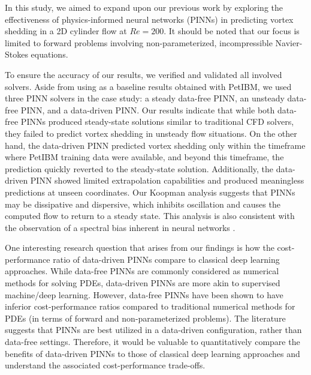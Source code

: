 
In this study, we aimed to expand upon our previous work \cite{chuang_experience_2022} by exploring the effectiveness of physics-informed neural networks (PINNs) in predicting vortex shedding in a 2D cylinder flow at $Re = 200$.
It should be noted that our focus is limited to forward problems involving non-parameterized, incompressible Navier-Stokes equations.

To ensure the accuracy of our results, we verified and validated all involved solvers.
Aside from using as a baseline results obtained with PetIBM, we used three PINN solvers in the case study: a steady data-free PINN, an unsteady data-free PINN, and a data-driven PINN.
Our results indicate that while both data-free PINNs produced steady-state solutions similar to traditional CFD solvers, they failed to predict vortex shedding in unsteady flow situations.
On the other hand, the data-driven PINN predicted vortex shedding only within the timeframe where PetIBM training data were available, and beyond this timeframe, the prediction quickly reverted to the steady-state solution.
Additionally, the data-driven PINN showed limited extrapolation capabilities and produced meaningless predictions at unseen coordinates.
Our Koopman analysis suggests that PINNs may be dissipative and dispersive, which inhibits oscillation and causes the computed flow to return to a steady state.
This analysis is also consistent with the observation of a spectral bias inherent in neural networks \cite{rahaman_spectral_2019}.

One interesting research question that arises from our findings is how the cost-performance ratio of data-driven PINNs compare to classical deep learning approaches.
While data-free PINNs are commonly considered as numerical methods for solving PDEs, data-driven PINNs are more akin to supervised machine/deep learning.
However, data-free PINNs have been shown to have inferior cost-performance ratios compared to traditional numerical methods for PDEs (in terms of forward and non-parameterized problems).
The literature suggests that PINNs are best utilized in a data-driven configuration, rather than data-free settings.
Therefore, it would be valuable to quantitatively compare the benefits of data-driven PINNs to those of classical deep learning approaches and understand the associated cost-performance trade-offs.

